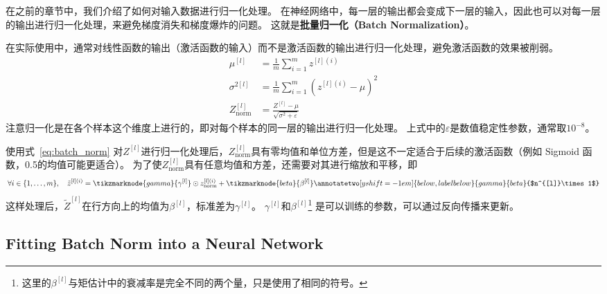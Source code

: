 在之前的章节中，我们介绍了如何对输入数据进行归一化处理。
在神经网络中，每一层的输出都会变成下一层的输入，因此也可以对每一层的输出进行归一化处理，来避免梯度消失和梯度爆炸的问题。
这就是\textbf{批量归一化（Batch Normalization）}。

在实际使用中，通常对线性函数的输出（激活函数的输入）而不是激活函数的输出进行归一化处理，避免激活函数的效果被削弱。
\begin{equation}
    \begin{aligned}
        \mu^{[l]} &= \frac{1}{m}\sum_{i=1}^m z^{[l](i)} \\
        \sigma^{2[l]} &= \frac{1}{m}\sum_{i=1}^m (z^{[l](i)} - \mu)^2 \\
        Z^{[l]}_{\mathrm{norm}} &= \frac{Z^{[l]} - \mu}{\sqrt{\sigma^2 + \varepsilon}}
    \end{aligned}
    \label{eq:batch_norm}
\end{equation}
注意归一化是在各个样本这个维度上进行的，即对每个样本的同一层的输出进行归一化处理。
上式中的$\varepsilon$是数值稳定性参数，通常取$10^{-8}$。

使用式~\eqref{eq:batch_norm} 对$Z^{[l]}$进行归一化处理后，$Z^{[l]}_{\mathrm{norm}}$具有零均值和单位方差，但是这不一定适合于后续的激活函数（例如 Sigmoid 函数，0.5的均值可能更适合）。
为了使$Z^{[l]}_{\mathrm{norm}}$具有任意均值和方差，还需要对其进行缩放和平移，即
\begin{equation}
    \forall i \in \{1, \ldots, m\}, \quad \tilde{z}^{[l](i)} = \tikzmarknode{gamma}{\gamma^{[l]}} \odot z^{[l](i)}_{\mathrm{norm}} + \tikzmarknode{beta}{\beta^{[l]}}
    \annotatetwo[yshift=-1em]{below,label below}{gamma}{beta}{$n^{[l]}\times 1$}
    \vspace{1.5em}
\end{equation}
这样处理后，$\tilde{Z}^{[l]}$在行方向上的均值为$\beta^{[l]}$，标准差为$\gamma^{[l]}$。
$\gamma^{[l]}$和$\beta^{[l]}$\footnote{这里的$\beta^{[l]}$与矩估计中的衰减率是完全不同的两个量，只是使用了相同的符号。}
是可以训练的参数，可以通过反向传播来更新。

\subsection{Fitting Batch Norm into a Neural Network}

